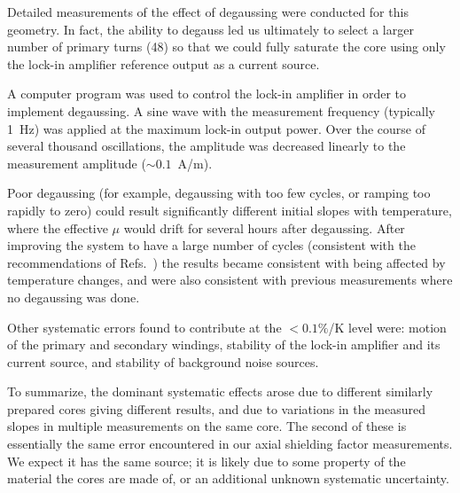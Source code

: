 Detailed measurements of the effect of degaussing were conducted for
this geometry.  In fact, the ability to degauss led us ultimately to
select a larger number of primary turns (48) so that we could fully
saturate the core using only the lock-in amplifier reference output as
a current source.

A computer program was used to control the lock-in amplifier in order
to implement degaussing.  A sine wave with the measurement frequency
(typically 1~Hz) was applied at the maximum lock-in output power.
Over the course of several thousand oscillations, the amplitude was
decreased linearly to the measurement amplitude ($\sim 0.1$~A/m).

Poor degaussing (for example, degaussing with too few cycles, or
ramping too rapidly to zero) could result significantly different
initial slopes with temperature, where the effective $\mu$ would drift
for several hours after degaussing.  After improving the system to
have a large number of cycles (consistent with the recommendations of
Refs.~\cite{bib:thiel,bib:others}) the results became consistent with
being affected by temperature changes, and were also consistent with
previous measurements where no degaussing was done.

Other systematic errors found to contribute at the $<0.1\%$/K level
were: motion of the primary and secondary windings, stability of the
lock-in amplifier and its current source, and stability of background
noise sources.

To summarize, the dominant systematic effects arose due to different
similarly prepared cores giving different results, and due to
variations in the measured slopes in multiple measurements on the same
core.  The second of these is essentially the same error encountered
in our axial shielding factor measurements.  We expect it has the same
source; it is likely due to some property of the material the cores
are made of, or an additional unknown systematic uncertainty.

